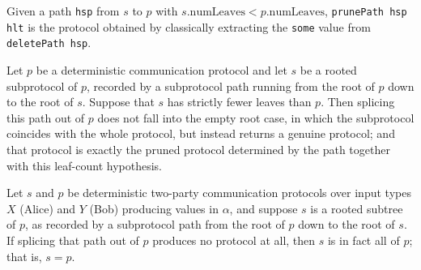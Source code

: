 \begin{definition}
\label{CommunicationComplexity.Deterministic.Protocol.prunePath}
\leanok
{}
Given a path \texttt{hsp} from $s$ to $p$ with $s.\mathrm{numLeaves} < p.\mathrm{numLeaves}$,
\texttt{prunePath hsp hlt} is the protocol obtained by classically extracting the \texttt{some}
value from \texttt{deletePath hsp}.
\end{definition}

\begin{lemma}
\label{CommunicationComplexity.Deterministic.Protocol.prunePath_spec}
\leanok
{}
Let $p$ be a deterministic communication protocol and let $s$ be a rooted subprotocol of
$p$, recorded by a subprotocol path running from the root of $p$ down to the root of
$s$. Suppose that $s$ has strictly fewer leaves than $p$. Then splicing this path out of
$p$ does not fall into the empty root case, in which the subprotocol coincides with the
whole protocol, but instead returns a genuine protocol; and that protocol is exactly the
pruned protocol determined by the path together with this leaf-count hypothesis.
\end{lemma}

\begin{lemma}
\label{CommunicationComplexity.Deterministic.Protocol.eq_of_deletePath_none}
\leanok
{}
Let $s$ and $p$ be deterministic two-party communication protocols over input types $X$
(Alice) and $Y$ (Bob) producing values in $\alpha$, and suppose $s$ is a rooted subtree
of $p$, as recorded by a subprotocol path from the root of $p$ down to the root of $s$.
If splicing that path out of $p$ produces no protocol at all, then $s$ is in fact all of
$p$; that is, $s = p$.
\end{lemma}

